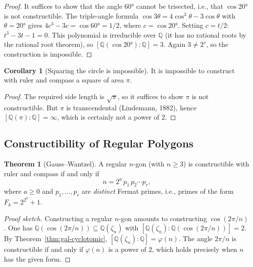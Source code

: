 \documentclass[12pt,a4paper,openany]{book}
\theoremstyle{definition}
\newtheorem{theorem}{Theorem}[chapter]
\newtheorem{corollary}{Corollary}[chapter]
\theoremstyle{remark}
\newcommand{\Q}{\mathbb{Q}}
\begin{document}
\begin{proof}
It suffices to show that the angle $60°$ cannot be trisected, i.e., that
$\cos 20°$ is not constructible.  The triple-angle formula
$\cos 3\theta=4\cos^{3}\theta-3\cos\theta$ with $\theta=20°$ gives
$4c^{3}-3c=\cos 60°=1/2$, where $c=\cos 20°$.  Setting $c=t/2$:
$t^{3}-3t-1=0$.  This polynomial is irreducible over $\Q$ (it has no
rational roots by the rational root theorem), so $[\Q(\cos 20°):\Q]=3$.
Again $3\neq 2^{s}$, so the construction is impossible.
\end{proof}

\begin{corollary}[Squaring the circle is impossible]\label{cor:squaring-circle}
It is impossible to construct with ruler and compass a square of area $\pi$.
\end{corollary}

\begin{proof}
The required side length is $\sqrt{\pi}$, so it suffices to show $\pi$ is
not constructible.  But $\pi$ is transcendental (Lindemann, 1882), hence
$[\Q(\pi):\Q]=\infty$, which is certainly not a power of $2$.
\end{proof}

\subsection{Constructibility of Regular Polygons}
\label{subsec:regular-polygons}

\begin{theorem}[Gauss--Wantzel]\label{thm:gauss-wantzel}
A regular $n$-gon (with $n\geq 3$) is constructible with ruler and compass
if and only if
\[
  n = 2^{a}\,p_{1}\,p_{2}\cdots p_{r},
\]
where $a\geq 0$ and $p_{1},\dots,p_{r}$ are \emph{distinct} Fermat primes,
i.e., primes of the form $F_{k}=2^{2^{k}}+1$.
\end{theorem}

\begin{proof}[Proof sketch]
Constructing a regular $n$-gon amounts to constructing $\cos(2\pi/n)$.
One has $\Q(\cos(2\pi/n))\subseteq\Q(\zeta_{n})$ with
$[\Q(\zeta_{n}):\Q(\cos(2\pi/n))]=2$.  By
Theorem~\ref{thm:gal-cyclotomic},
$[\Q(\zeta_{n}):\Q]=\varphi(n)$.  The angle $2\pi/n$ is constructible if
and only if $\varphi(n)$ is a power of $2$, which holds precisely when $n$
has the given form.
\end{proof}
\end{document}
